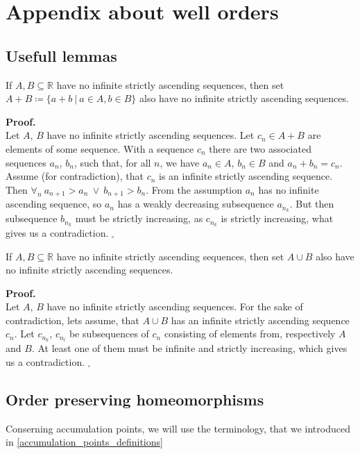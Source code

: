 \chapter{Appendix about well orders}
\section{Usefull lemmas}
\begin{lemma}\label{two_sets_lemma}
If $A, B \subseteq \mathbb{R}$ have no infinite strictly ascending sequences, then set 
$A + B \coloneqq \{a+b\ |\ a \in A, b \in B\}$ also have no infinite strictly ascending sequences. 
\end{lemma}
\noindent\textbf{Proof.} \\
Let $A$, $B$ have no infinite strictly ascending sequences. 
Let $c_n \in A + B$ are elements of some sequence. With a sequence $c_n$ there are 
two associated sequences $a_n$, $b_n$, such that, for all $n$, we have $a_n \in A$, 
$b_n \in B$ and 
$a_n + b_n = c_n$. Assume (for contradiction), that $c_n$ is an infinite strictly 
ascending sequence. 
Then $\forall_n\ a_{n+1}>a_n\ \lor\ b_{n+1} > b_n$. From the assumption $a_n$ has no infinite 
ascending sequence, so $a_n$ has a weakly decreasing subsequence $a_{n_k}$. But then 
subsequence $b_{n_k}$ must be strictly increasing, as $c_{n_k}$ is strictly increasing, what gives 
us a contradiction. 
$_\square$ 

\begin{lemma}\label{sum_lemma}
If $A, B \subseteq \mathbb{R}$ have no infinite strictly ascending sequences, then set 
$A \cup B$ also have no infinite strictly ascending sequences.
\end{lemma}
\textbf{Proof.} \\
Let $A$, $B$ have no infinite strictly ascending sequences. 
For the sake of contradiction, lets assume, that $A \cup B$ has an infinite strictly 
ascending sequence $c_n$. Let $c_{n_k}$, $c_{n_l}$ be subsequences of $c_n$ consisting 
of elements from, respectively $A$ and $B$. At least one of them must be infinite and 
strictly increasing, which gives us a contradiction. $_\square$ 
\section{Order preserving homeomorphisms}
Conserning accumulation points, we will use the terminology, that we introduced in 
\ref{accumulation_points_definitions}

